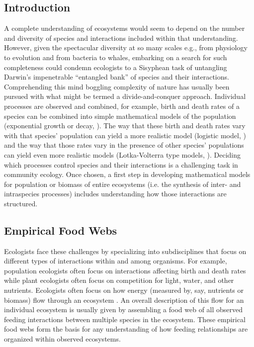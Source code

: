\documentclass[../dissertation.tex]{subfiles}
\begin{document}
\begin{bibunit}
\chapter{Introduction}

A complete understanding of ecosystems would seem to depend on the number and
diversity of species and interactions included within that understanding.
However, given the spectacular diversity at so many scales e.g., from
physiology to evolution and from bacteria to whales, embarking on a search for
such completeness could condemn ecologists to a Sisyphean task of untangling
Darwin's impenetrable ``entangled bank'' of species and their interactions.
Comprehending this mind boggling complexity of nature has usually
been pursued with what might be termed a divide-and-conquer approach.
Individual processes are observed and combined, for example, birth and death
rates of a species can be combined into simple mathematical models of the
population (exponential growth or decay, \cite*{Malthus1817}). The way that these birth and death
rates vary with that species' population can yield a more realistic model
(logistic model, \cite*{Verhulst1844}) and the way that those rates vary in the presence of other
species' populations can yield even more realistic models (Lotka-Volterra type
models, \cite*{Lotka1920,Volterra1928}). Deciding which processes control species and their interactions is a
challenging task in community ecology.  Once chosen, a first step in developing
mathematical models for population or biomass of entire ecosystems (i.e. the
synthesis of inter- and intraspecies processes) includes understanding how
those interactions are structured.

\section{Empirical Food Webs}

Ecologists face these challenges by specializing into subdisciplines that focus
on different types of interactions within and among organisms. For example,
population ecologists often focus on interactions affecting birth and death
rates while plant ecologists often focus on competition for light, water, and
other nutrients. Ecologists often focus on how energy (measured by, say, nutrients
or biomass) flow through an ecosystem \cite*{Elton1927, MacArthur1955}.
An overall description of this flow for an individual ecosystem is usually
given by assembling a food web of all observed feeding interactions between
multiple species in the ecosystem. These empirical food webs form the basis for
any understanding of how feeding relationships are organized within observed
ecosystems.


\end{bibunit}
\end{document}
